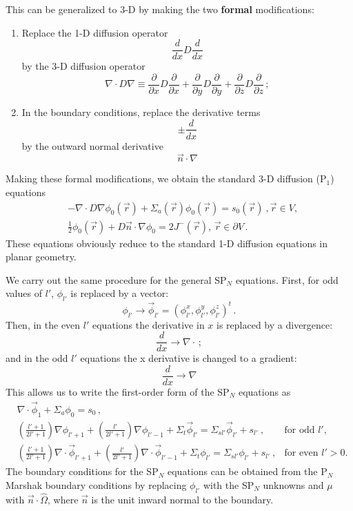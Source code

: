 \documentclass[12pt]{article}
\newcommand{\vecr}{\ensuremath{\vec{r}}}
\newcommand{\omvec}{\ensuremath{\hat{\Omega}}}
\begin{document}
This can be generalized to 3-D by making the two \textbf{formal} modifications: 
\begin{enumerate}
\item Replace the 1-D diffusion operator 
\[
\frac{d }{dx}D\frac{d }{dx}
\]
by the 3-D diffusion operator
\[
\nabla\cdot D\nabla \equiv \frac{\partial }{\partial x}D\frac{\partial }{\partial x}+\frac{\partial }{\partial y}D\frac{\partial }{\partial y}+\frac{\partial }{\partial z}D\frac{\partial }{\partial z}\,;
\]
\item In the boundary conditions, replace the derivative terms
\[
\pm\frac{d }{dx}
\]
by the outward normal derivative
\[
\vec{n} \cdot \nabla
\]
\end{enumerate}
Making these formal modifications, we obtain the standard 3-D diffusion (P$_1$) equations
\begin{align*}
&-\nabla\cdot D\nabla\phi_0(\vecr) + \Sigma_a(\vecr) \phi_0(\vecr) = s_0(\vecr)\:, \vecr \in V,\\
&\frac{1}{2}\phi_0(\vecr)+D\vec{n}\cdot\nabla\phi_0 = 2J^-(\vecr), \, \vecr\in \partial V\,.
\end{align*}
These equations obviously reduce to the standard 1-D diffusion equations in planar geometry.

We carry out the same procedure for the general SP$_N$ equations. First, for odd values of $l'$, $\phi_{l'}$ is replaced by a vector:
\[
\phi_{l'} \rightarrow \vec{\phi}_{l'} = (\phi_{l'}^x,\phi_{l'}^y,\phi_{l'}^z)^t\,.
\]
Then, in the even $l'$ equations the derivative in $x$ is replaced by a divergence: 
\[
\frac{d}{dx} \rightarrow \nabla \cdot\,;
\]
and in the odd $l'$ equations the x derivative is changed to a gradient: 
\[
\frac{d}{dx} \rightarrow \nabla
\]
This allows us to write the first-order form of the SP$_N$ equations as 
\begin{align*}
&\nabla \cdot \vec{\phi}_1 + \Sigma_a\phi_0 = s_0\,,&&\\
&\left(\frac{l'+1}{2l'+1}\right)\nabla\phi_{l'+1} + \left(\frac{l'}{2l'+1}\right)\nabla\phi_{l'-1} + \Sigma_t \vec{\phi}_{l'} = \Sigma_{sl'}\vec{\phi}_{l'} + s_{l'}\:, & \text{for odd $l'$,}&\\
&\left(\frac{l'+1}{2l'+1}\right)\nabla\cdot\vec{\phi}_{l'+1} + \left(\frac{l'}{2l'+1}\right)\nabla\cdot\vec{\phi}_{l'-1} + \Sigma_t \phi_{l'} = \Sigma_{sl'}\phi_{l'} + s_{l'}\:, &\text{for even $l'>0$.}&
\end{align*}
The boundary conditions for the SP$_N$ equations can be obtained from the P$_N$ Marshak boundary conditions by replacing $\phi_{l'}$ with the SP$_N$ unknowns and $\mu$ with $\vec{n}\cdot\omvec$, where $\vec{n}$ is the unit inward normal to the boundary.
\end{document}
